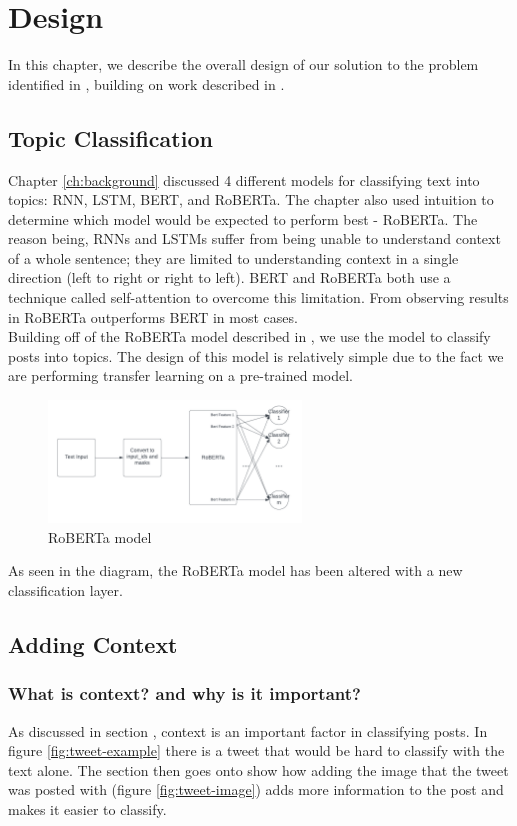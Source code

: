 \chapter{Design}
\label{ch:design}

In this chapter, we describe the overall design of our solution to the problem identified in , building on work described in .

\section{Topic Classification}
Chapter \ref{ch:background} discussed 4 different models for classifying text into topics: RNN, LSTM, BERT, and RoBERTa.
The chapter also used intuition to determine which model would be expected to perform best - RoBERTa. The reason being,
RNNs and LSTMs suffer from being unable to understand context of a whole sentence; they are limited to understanding context
in a single direction (left to right or right to left). BERT and RoBERTa both use a technique called self-attention to overcome
this limitation. From observing results in \cite{DBLP:journals/corr/abs-1907-11692} RoBERTa outperforms BERT in most cases.\\
Building off of the RoBERTa model described in , we use the model to classify posts into topics.
The design of this model is relatively simple due to the fact we are performing transfer learning on a pre-trained model.
\begin{figure}[hbtp]
    \centering
    \includegraphics[width=0.6\textwidth]{../images/classification-model.png}
    \caption{RoBERTa model}
    \label{fig:roberta}
\end{figure}

As seen in the diagram, the RoBERTa model has been altered with a new classification layer.

\section{Adding Context}
\subsection{What is context? and why is it important?}
As discussed in section , context is an important factor in classifying posts. In figure \ref{fig:tweet-example} there
is a tweet that would be hard to classify with the text alone. The section then goes onto show how adding the image that the tweet
was posted with (figure \ref{fig:tweet-image}) adds more information to the post and makes it easier to classify.
